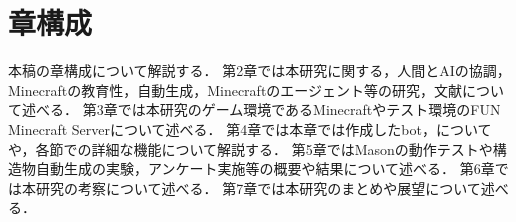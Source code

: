 \section{章構成}
本稿の章構成について解説する．
第2章では本研究に関する，人間とAIの協調，Minecraftの教育性，自動生成，Minecraftのエージェント等の研究，文献について述べる．
第3章では本研究のゲーム環境であるMinecraftやテスト環境のFUN Minecraft Serverについて述べる．
第4章では本章では作成したbot，{\mason}についてや，各節で{\mason}の詳細な機能について解説する．
第5章ではMasonの動作テストや構造物自動生成の実験，アンケート実施等の概要や結果について述べる．
第6章では本研究の考察について述べる．
第7章では本研究のまとめや展望について述べる．